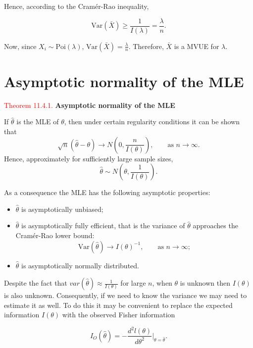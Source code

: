 \documentclass[
]{book}
\providecommand{\tightlist}{%
  \setlength{\itemsep}{0pt}\setlength{\parskip}{0pt}}
\begin{document}
Hence, according to the Cramér-Rao inequality,

\[\text{Var}(\bar{X}) \geq \frac{1}{I(\lambda)} = \frac{\lambda}{n}.\]

Now, since \(X_i \sim \text{Poi}(\lambda)\), \(\text{Var}(\bar{X}) = \frac{\lambda}{n}\). Therefore, \(\bar{X}\) is a MVUE for \(\lambda\).

\hfill\break

\hypertarget{MLEprop:asymptotic}{%
\section{Asymptotic normality of the MLE}\label{MLEprop:asymptotic}}

\leavevmode{}%
\textcolor{red}{Theorem 11.4.1.}
{\textbf{Asymptotic normality of the MLE}}

If \(\hat{\theta}\) is the MLE of \(\theta\), then under certain regularity conditions it can be shown that
\[\sqrt{n}(\hat{\theta}-\theta) \longrightarrow N \left( 0, \frac{n}{I(\theta)} \right), \qquad \text{as } n \rightarrow \infty.\]
Hence, approximately for sufficiently large sample sizes,
\[\hat{\theta} \sim N \left( \theta, \frac{1}{I(\theta)} \right).\]

As a consequence the MLE has the following asymptotic properties:

\begin{itemize}
\tightlist
\item
  \(\hat{\theta}\) is asymptotically unbiased;\\
\item
  \(\hat{\theta}\) is asymptotically fully efficient, that is the variance of \(\hat{\theta}\) approaches the Cramér-Rao lower bound:\\

  \[\text{Var}(\hat{\theta}) \rightarrow I(\theta)^{-1}, \qquad \text{as } n \rightarrow \infty;\]
\item
  \(\hat{\theta}\) is asymptotically normally distributed.
\end{itemize}

Despite the fact that \(var(\hat{\theta}) \approx \frac{1}{I(\theta)}\) for large \(n\), when \(\theta\) is unknown then \(I(\theta)\) is also unknown. Consequently, if we need to know the variance we may need to estimate it as well. To do this it may be convenient to replace the expected information \(I(\theta)\) with the observed Fisher information

\[I_O(\hat{\theta}) = - \frac{ d^2 l(\theta) }{ d\theta^2 } \bigg|_{\theta = \hat{\theta}}.\]
\end{document}
